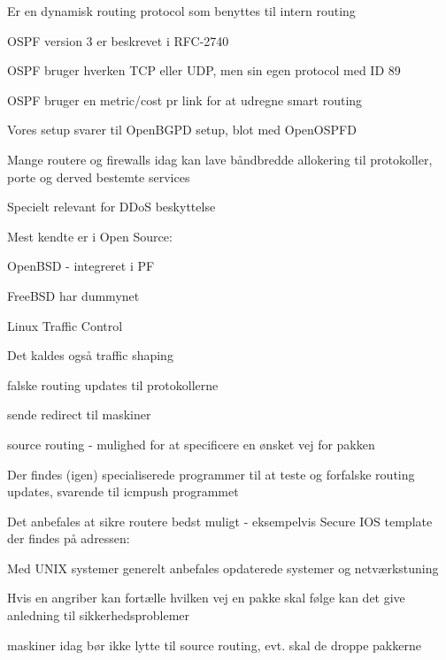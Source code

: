 \documentclass[Screen16to9,17pt]{foils}
\begin{document}
\begin{list1}
\item Er en dynamisk routing protocol som benyttes til intern routing
\item OSPF version 3 er beskrevet i RFC-2740
\item OSPF bruger hverken TCP eller UDP, men sin egen protocol med ID 89
\item OSPF bruger en metric/cost pr link for at udregne smart routing
\item {}
\item Vores setup svarer til OpenBGPD setup, blot med OpenOSPFD
\end{list1}






\begin{list1}
\item Mange routere og firewalls idag kan lave båndbredde allokering til
  protokoller, porte og derved bestemte services
  \item Specielt relevant for DDoS beskyttelse
\item Mest kendte er i Open Source:
\begin{list2}
\item OpenBSD - integreret i PF
\item FreeBSD har dummynet
\item Linux Traffic Control
\end{list2}
\item Det kaldes også traffic shaping
\end{list1}



\begin{list1}
  \item falske routing updates til protokollerne
\item sende redirect til maskiner
\item source routing - mulighed for at specificere en ønsket vej for
  pakken
\item Der findes (igen) specialiserede programmer til at teste og
  forfalske routing updates, svarende til icmpush programmet
\item Det anbefales at sikre routere bedst muligt - eksempelvis
Secure IOS template der findes på adressen:\\
{\small {}}
\item Med UNIX systemer generelt anbefales opdaterede systemer og netværkstuning
\end{list1}



\begin{list1}
\item Hvis en angriber kan fortælle hvilken vej en pakke skal følge
  kan det give anledning til sikkerhedsproblemer
\item maskiner idag bør ikke lytte til source routing, evt. skal de
  droppe pakkerne
\end{list1}


\slidenext
\end{document}
